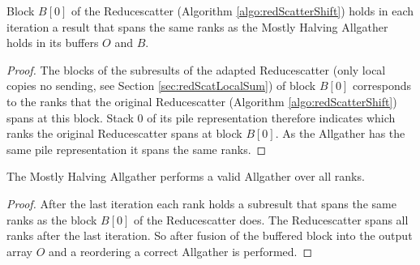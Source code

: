 \begin{corollary}
	Block $B[0]$ of the Reducescatter (Algorithm \ref{algo:redScatterShift}) holds in each iteration a result that spans the same ranks as the Mostly Halving Allgather holds in its buffers $O$ and $B$.  
\end{corollary} \label{coro:mostlyHalvingSpansSameRanks}
\begin{proof}
	The blocks of the  subresults of the adapted Reducescatter (only local copies no sending, see Section \ref{sec:redScatLocalSum}) of block $B[0]$ corresponds to the ranks that the original Reducescatter (Algorithm \ref{algo:redScatterShift}) spans at this block. Stack 0 of its pile representation therefore indicates which ranks the original Reducescatter spans at block $B[0]$. As the Allgather has the same pile representation it spans the same ranks.
\end{proof}
\begin{corollary}
	The Mostly Halving Allgather performs a valid Allgather over all ranks.
\end{corollary}
\begin{proof}
	After the last iteration each rank holds a  subresult that spans the same ranks as the block $B[0]$ of the Reducescatter does. The Reducescatter spans all ranks after the last iteration. So after fusion of the buffered block into the output array $O$ and a reordering a correct Allgather is performed.
\end{proof}


